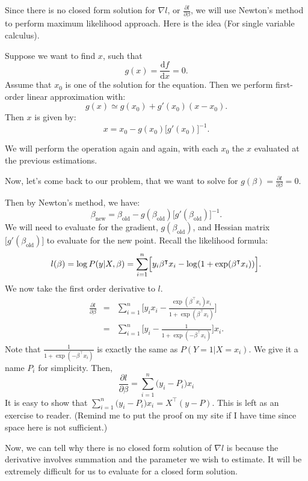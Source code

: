 \documentclass{article}
\theoremstyle{MyNonumberplain}
\theoremstyle{break}
\newcommand{\T}{^\intercal}
\newcommand{\inv}{^{-1}}
\newcommand{\pd}[2]{\frac{\partial {#1}}{\partial {#2}}}
\newcommand{\dd}{\mathrm{d}}
\theoremstyle{break}
\theoremstyle{break}
\theoremstyle{break}
\begin{document}
Since there is no closed form solution for $\nabla l$, or $\pd{l}{\beta}$,
we will use Newton's method to perform maximum likelihood approach. Here is the idea (For single variable calculus).

Suppose we want to find $x$, such that 
$$
    g(x) = \frac{\dd{f}}{\dd{x}} = 0.
$$
Assume that $x_0$ is one of the solution for the equation. Then we perform first-order linear approximation with:
$$
    g(x)\simeq g(x_0)+g'(x_0)(x-x_0).
$$
Then $x$ is given by:
$$
    x = x_0-g(x_0)\bigl[g'(x_0)\bigr]\inv.
$$

We will perform the operation again and again, with each $x_0$ the $x$ evaluated at the previous estimations.

Now, let's come back to our problem, that we want to solve for $g(\beta)=\pd{l}{\beta}=0$.

Then by Newton's method, we have:
$$
    \beta_{\text{new}} = \beta_{\text{old}}-g(\beta_{\text{old}})\bigl[g'(\beta_{\text{old}})\bigr]\inv.
$$
We will need to evaluate for the gradient, $g(\beta_{\text{old}})$, and Hessian matrix $\bigl[g'(\beta_{\text{old}})\bigr]$ to evaluate for the new point.
Recall the likelihood formula:
$$
    l(\beta)=\log P(y\vert X,\beta) = \sum_{i=1}^n \Bigl[y_i\beta\T x_i-\log(1+\exp(\beta\T x_i))\Bigr].
$$
We now take the first order derivative to $l$.
\begin{eqnarray*}
    \pd{l}{\beta} &=& \sum_{i=1}^n \Biggl[y_ix_i-\frac{\exp(\beta\T x_i)x_i}{1+\exp(\beta\T x_i)}\Biggr]\\
                  &=& \sum_{i=1}^n \Biggl[y_i-\frac{1}{1+\exp(-\beta\T x_i)}\Biggr]x_i.
\end{eqnarray*}
Note that $\frac{1}{1+\exp(-\beta\T x_i)}$ is exactly the same as $P(Y=1\vert X=x_i)$. We give it a name $P_i$ for simplicity. Then,
$$
\pd{l}{\beta} = \sum_{i=1}^n \bigl(y_i-P_i\bigr)x_i
$$
It is easy to show that $ \sum_{i=1}^n \bigl(y_i-P_i\bigr)x_i = X\T (y-P)$. This is left as an exercise to reader. (Remind me to put the proof on my site if I have time since space here is not sufficient.)

Now, we can tell why there is no closed form solution of $\nabla l$ is because the derivative involves summation and the parameter we wish to estimate.
It will be extremely difficult for us to evaluate for a closed form solution.
\end{document}
